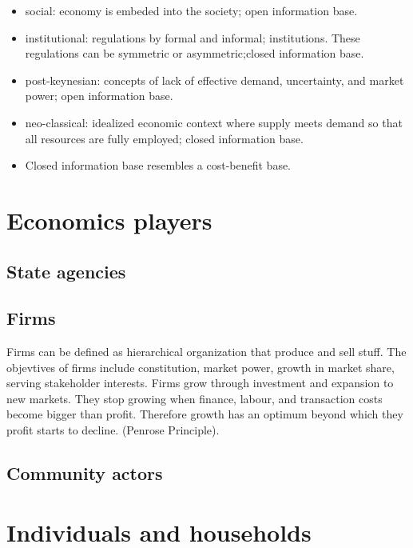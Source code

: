 \documentclass[
]{book}
\begin{document}
\begin{itemize}
\item
  social: economy is embeded into the society; open information base.
\item
  institutional: regulations by formal and informal; institutions. These regulations can be symmetric or asymmetric;closed information base.
\item
  post-keynesian: concepts of lack of effective demand, uncertainty, and market power; open information base.
\item
  neo-classical: idealized economic context where supply meets demand so that all resources are fully employed; closed information base.
\item
  Closed information base resembles a cost-benefit base.
\end{itemize}

\hypertarget{economics-players}{%
\section{Economics players}\label{economics-players}}

\hypertarget{state-agencies}{%
\subsection{State agencies}\label{state-agencies}}

\hypertarget{firms}{%
\subsection{Firms}\label{firms}}

Firms can be defined as hierarchical organization that produce and sell stuff. The objevtives of firms include constitution, market power, growth in market share, serving stakeholder interests.
Firms grow through investment and expansion to new markets. They stop growing when finance, labour, and transaction costs become bigger than profit. Therefore growth has an optimum beyond which they profit starts to decline. (Penrose Principle).

\hypertarget{community-actors}{%
\subsection{Community actors}\label{community-actors}}

\hypertarget{individuals-and-households}{%
\section{Individuals and households}\label{individuals-and-households}}
\end{document}
